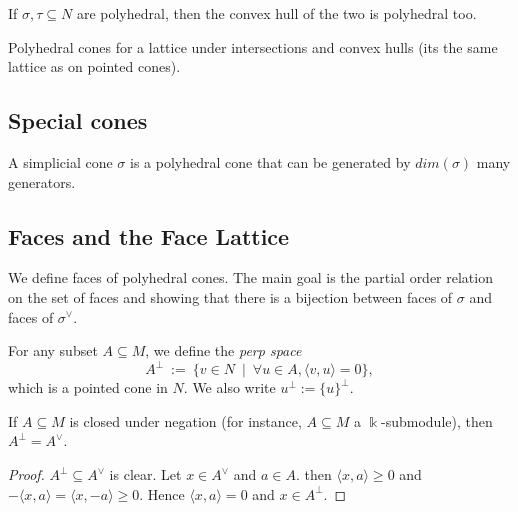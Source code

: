 \begin{proposition}
  \label{convex-hull-polyhedral-cone}
  If \( \sigma, \tau \subseteq N \) are
  polyhedral, then the convex hull of the two is polyhedral too.
\end{proposition}

\begin{proposition}
  \label{polyhedra-lattice}
  Polyhedral cones for a lattice under intersections and convex hulls (its the same lattice as on pointed cones).
\end{proposition}

\subsection{Special cones}

\begin{proposition}
  \label{simplicial-cone}
  A simplicial cone \(\sigma\) is a polyhedral cone that can be generated by \(dim (\sigma)\) many
  generators.
\end{proposition}

\subsection{Faces and the Face Lattice}

We define faces of polyhedral cones. The main goal is the partial
order relation on the set of faces and showing that there is a
bijection between faces of \( \sigma \) and faces of \( \sigma^{\vee}
\).

\begin{definition}
  \label{perp}
  \uses{}
  \leanok
  For any subset \( A \subseteq M \), we define the \emph{perp space}
  \[
      A^{\perp}\ :=\ \{v \in N\ \mid\ \forall u \in A, \langle v, u \rangle = 0\},
  \]
  which is a pointed cone in \( N \). We also write \( u^{\perp} :=
  \{u\}^{\perp} \).
\end{definition}

\begin{lemma}
  \label{perp-closed-negation}
  \uses{}
  \lean{}
  \leanok
  If \( A \subseteq M \) is closed under negation (for instance, \( A
  \subseteq M \) a \( \Bbbk \)-submodule), then \( A^{\perp} =
  A^{\vee} \).
\end{lemma}
\begin{proof}
  \uses{}
  \leanok
  \( A^{\perp} \subseteq A^{\vee} \) is clear. Let \( x \in A^{\vee}
  \) and \( a \in A \). then \( \langle x, a \rangle \geq 0 \) and \(
  -\langle x, a \rangle = \langle x, -a \rangle \geq 0 \). Hence \(
  \langle x, a \rangle = 0 \) and \( x \in A^{\perp} \).
\end{proof}


